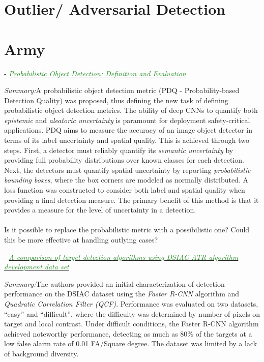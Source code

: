 \documentclass[]{article}
\newcommand{\paperentry}[4]{
            \hangindent=1cm
            \cite{#1} - \href{run:../References/#3}{\textcolor{ForestGreen}{\textit{#2}}}
            
            \noindent            
            \begin{minipage}[t]{0.1\linewidth}\hfill\end{minipage}
            \begin{minipage}[t]{0.8\linewidth}\textcolor{NavyBlue}{{\textit{Summary:}}}#4\end{minipage}
            \vspace{.25cm}
          }
\begin{document}
\section{Outlier/ Adversarial Detection}

\section{Army}

\paperentry{Hall2019ProbabilisticObjectDetection}
{Probabilistic Object Detection: Definition and Evaluation}
{Army/Hall2019ProbabilisticObjectDetection.pdf}
{A probabilistic object detection metric (PDQ - Probability-based Detection Quality) was proposed, thus defining the new task of defining probabilistic object detection metrics.  The ability of deep CNNs to quantify both \textit{epistemic} and \textit{aleatoric uncertainty} is paramount for deployment safety-critical applications.  PDQ aims to measure the accuracy of an image object detector in terms of its label uncertainty and spatial quality.  This is achieved through two steps.  First, a detector must reliably quantify its \textit{semantic uncertainty} by providing full probability distributions over known classes for each detection.  Next, the detectors must quantify spatial uncertainty by reporting \textit{probabilistic bounding boxes}, where the box corners are modeled as normally distributed.  A loss function was constructed to consider both label and spatial quality when providing a final detection measure.  The primary benefit of this method is that it provides a measure for the level of uncertainty in a detection. \\ \\ Is it possible to replace the probabilistic metric with a possibilistic one?  Could this be more effective at handling outlying cases?} 


\paperentry{Mahalanobis2019DSIACCharacterization}
{A comparison of target detection algorithms using DSIAC ATR algorithm development data set}
{Army/Mahalanobis2019DSIACCharacterization.pdf}
{The authors provided an initial characterization of detection performance on the DSIAC dataset using the \textit{Faster R-CNN} algorithm and \textit{Quadratic Correlation Filter (QCF)}.  Performance was evaluated on two datasets, ``easy'' and ``difficult'', where the difficulty was determined by number of pixels on target and local contrast.  Under difficult conditions, the Faster R-CNN algorithm achieved noteworthy performance, detecting as much as 80\% of the targets at a low false alarm rate of 0.01 FA/Square degree.  The dataset was limited by a lack of background diversity. }
\end{document}
